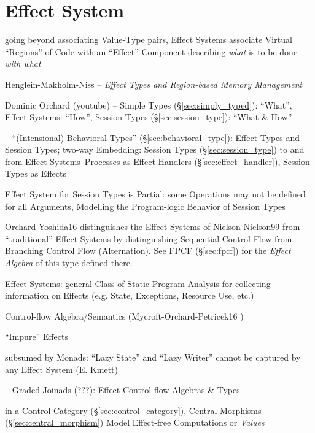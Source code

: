 \section{Effect System}\label{sec:effect_system}

going beyond associating Value-Type pairs, Effect Systems associate
Virtual ``Regions'' of Code with an ``Effect'' Component describing
\emph{what} is to be done \emph{with what}

Henglein-Makholm-Niss -- \emph{Effect Types and Region-based Memory
Management}

Dominic Orchard (youtube) -- Simple Types (\S\ref{sec:simply_typed}):
``What'', Effect Systems: ``How'', Session Types
(\S\ref{sec:session_type}): ``What \& How''

\cite{orchard-yoshida16} -- ``(Intensional) Behavioral Types''
(\S\ref{sec:behavioral_type}): Effect Types and Session Types; two-way
Embedding: Session Types (\S\ref{sec:session_type}) to and from Effect
Systems--Processes as Effect Handlers (\S\ref{sec:effect_handler}),
Session Types as Effects

Effect System for Session Types is Partial: some Operations may not be
defined for all Arguments, Modelling the Program-logic Behavior of
Session Types \cite{orchard-yoshida16} %

\fist Orchard-Yoshida16 \cite{orchard-yoshida16} distinguishes the
Effect Systems of Nielson-Nielson99 \cite{nielson-nielson99} from
``traditional'' Effect Systems by distinguishing Sequential Control
Flow from Branching Control Flow (Alternation). See FPCF
(\S\ref{sec:fpcf}) for the \emph{Effect Algebra} of this type defined
there.

Effect Systems: general Class of Static Program Analysis for
collecting information on Effects (e.g. State, Exceptions, Resource
Use, etc.) \cite{orchard-yoshida16}

Control-flow Algebra/Semantics (Mycroft-Orchard-Petricek16
\cite{mycroft-orchard-petricek16})

``Impure'' Effects

subsumed by Monads: ``Lazy State'' and ``Lazy Writer'' cannot be
captured by any Effect System (E. Kmett)

\cite{mycroft-orchard-petricek16} -- Graded Joinads (???): Effect
Control-flow Algebras \& Types

in a Control Category (\S\ref{sec:control_category}), Central
Morphisms (\S\ref{sec:central_morphism}) Model Effect-free
Computations or \emph{Values} %

